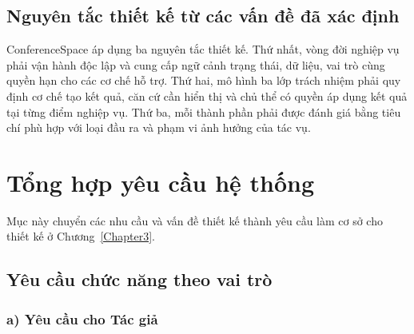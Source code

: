 \subsection{Nguyên tắc thiết kế từ các vấn đề đã xác định}

ConferenceSpace áp dụng ba nguyên tắc thiết kế. Thứ nhất, vòng đời nghiệp vụ phải vận hành độc lập và cung cấp ngữ cảnh trạng thái, dữ liệu, vai trò cùng quyền hạn cho các cơ chế hỗ trợ. Thứ hai, mô hình ba lớp trách nhiệm phải quy định cơ chế tạo kết quả, căn cứ cần hiển thị và chủ thể có quyền áp dụng kết quả tại từng điểm nghiệp vụ. Thứ ba, mỗi thành phần phải được đánh giá bằng tiêu chí phù hợp với loại đầu ra và phạm vi ảnh hưởng của tác vụ.

\section{Tổng hợp yêu cầu hệ thống}
\label{sec:ch2-requirements}

Mục này chuyển các nhu cầu và vấn đề thiết kế thành yêu cầu làm cơ sở cho thiết kế ở Chương~\ref{Chapter3}.

\subsection{Yêu cầu chức năng theo vai trò}

\subsubsection{a) Yêu cầu cho Tác giả}

\begingroup
\setlength{\tabcolsep}{4pt}
\renewcommand{\arraystretch}{1.3}

